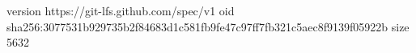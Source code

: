 version https://git-lfs.github.com/spec/v1
oid sha256:3077531b929735b2f84683d1c581fb9fe47c97ff7fb321c5aec8f9139f05922b
size 5632
